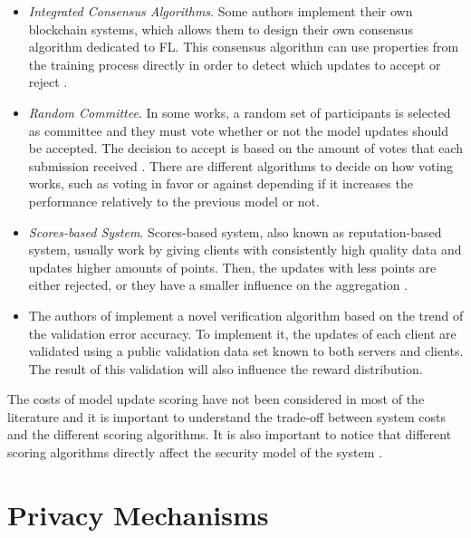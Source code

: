\begin{itemize}
    \item \textit{Integrated Consensus Algorithms}. Some authors implement their own blockchain systems, which allows them to design their own consensus algorithm dedicated to FL. This consensus algorithm can use properties from the training process directly in order to detect which updates to accept or reject \cite{9293091, 10.1007/978-981-15-9213-3_12}.
    
    \item \textit{Random Committee}. In some works, a random set of participants is selected as committee and they must vote whether or not the model updates should be accepted. The decision to accept is based on the amount of votes that each submission received \cite{9159643}. There are different algorithms to decide on how voting works, such as voting in favor or against depending if it increases the performance relatively to the previous model or not.
    
    \item \textit{Scores-based System}. Scores-based system, also known as reputation-based system, usually work by giving clients with consistently high quality data and updates higher amounts of points. Then, the updates with less points are either rejected, or they have a smaller influence on the aggregation  \cite{10.48550/arxiv.2011.07516, 9170559, Peyvandi2022, 9292450}.
    
    \item The authors of \cite{8945913} implement a novel verification algorithm based on the trend of the validation error accuracy. To implement it, the updates of each client are validated using a public validation data set known to both servers and clients. The result of this validation will also influence the reward distribution.

\end{itemize}

The costs of model update scoring have not been considered in most of the literature and it is important to understand the trade-off between system costs and the different scoring algorithms\cite{9403374, 10.48550/arxiv.2110.02182}. It is also important to notice that different scoring algorithms directly affect the security model of the system \cite{10.48550/arxiv.2110.02182}.

\section{Privacy Mechanisms}\label{related_work:privacy}

